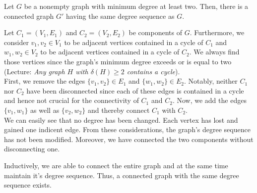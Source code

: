 \documentclass[a4paper]{article}
\begin{document}
\begin{solution}{5}
\begin{theorem}{Let $G$ be a nonempty graph with minimum degree at least two. Then, there is a connected graph $G'$ having the same degree sequence as $G$.}
\begin{center}
{
				}
			\end{center}

			Let $C_1 = (V_1, E_1)$ and $C_2 = (V_2, E_2)$ be components of $G$. Furthermore, we consider $v_1, v_2 \in V_1$ to be adjacent vertices contained in a cycle of $C_1$ and $w_1, w_2 \in V_2$ to be adjacent vertices contained in a cycle of $C_2$. We always find those vertices since the graph's minimum degree exceeds or is equal to two (Lecture: \emph{Any graph $H$ with $\delta(H) \geq 2$ contains a cycle}).\\

			First, we remove the edges $\{v_1, v_2\} \in E_1$ and $\{w_1, w_2\} \in E_2$. Notably, neither $C_1$ nor $C_2$ have been disconnected since each of these edges is contained in a cycle and hence not crucial for the connectivity of $C_1$ and $C_2$. Now, we add the edges $\{v_1, w_1\}$ as well as $\{v_2, w_2\}$ and thereby connect $C_1$ with $C_2$.\\
			
			We can easily see that no degree has been changed. Each vertex has lost and gained one indicent edge. From these considerations, the graph's degree sequence has not been modified. Moreover, we have connected the two components without disconnecting one.

			Inductively, we are able to connect the entire graph and at the same time maintain it's degree sequence. Thus, a connected graph with the same degree sequence exists.

		\end{theorem}
	\end{solution}
	\newpage
\end{document}
